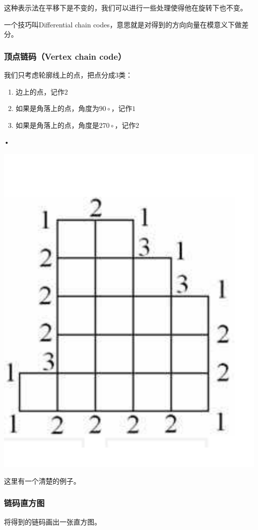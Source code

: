 \documentclass{ctexart}
\begin{document}
这种表示法在平移下是不变的，我们可以进行一些处理使得他在旋转下也不变。

一个技巧叫Differential chain codes，意思就是对得到的方向向量在模意义下做差分。
\subsubsection{顶点链码（Vertex chain code）}
我们只考虑轮廓线上的点，把点分成$3$类：
\begin{enumerate}
\item 边上的点，记作$2$
\item 如果是角落上的点，角度为$90\circ$，记作$1$
\item 如果是角落上的点，角度是$270\circ$，记作$2$
\end{enumerate}•

\includegraphics{2.png}

这里有一个清楚的例子。
\subsubsection{链码直方图}
将得到的链码画出一张直方图。
\end{document}
